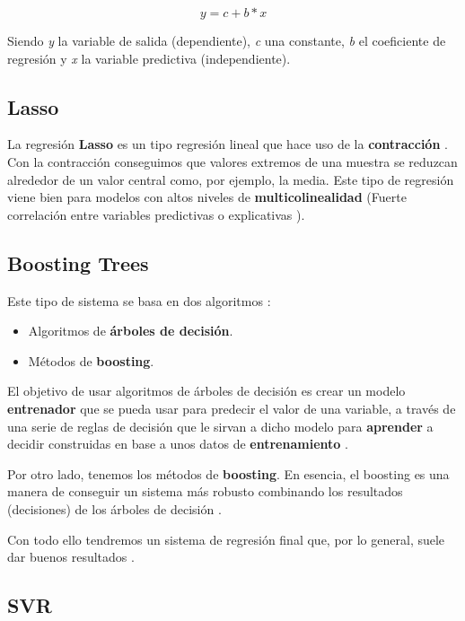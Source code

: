 \begin{equation}
y = c + b*x
\end{equation}

Siendo \textit{y} la variable de salida (dependiente), \textit{c} una constante, \textit{b} el coeficiente de regresión y \textit{x} la variable predictiva (independiente).

\subsection{Lasso}

La regresión \textbf{Lasso} \cite{lasso} es un tipo regresión lineal que hace uso de la \textbf{contracción} \cite{shrinkage}. Con la contracción conseguimos que valores extremos de una muestra se reduzcan alrededor de un valor central como, por ejemplo, la media. Este tipo de regresión viene bien para modelos con altos niveles de \textbf{multicolinealidad} (Fuerte correlación entre variables predictivas o explicativas \cite{multicollinearity}).

\subsection{Boosting Trees}

Este tipo de sistema se basa en dos algoritmos \cite{boosting-trees}:

\begin{itemize}
\item Algoritmos de \textbf{árboles de decisión}.
\item Métodos de \textbf{boosting}.
\end{itemize}

El objetivo de usar algoritmos de árboles de decisión es crear un modelo \textbf{entrenador} que se pueda usar para predecir el valor de una variable, a través de una serie de reglas de decisión que le sirvan a dicho modelo para \textbf{aprender} a decidir construidas en base a unos datos de \textbf{entrenamiento} \cite{decision-tree}.

Por otro lado, tenemos los métodos de \textbf{boosting}. En esencia, el boosting es una manera de conseguir un sistema más robusto combinando los resultados (decisiones) de los árboles de decisión \cite{boosting}.

Con todo ello tendremos un sistema de regresión final que, por lo general, suele dar buenos resultados \cite{isa2}.

\subsection{SVR}

